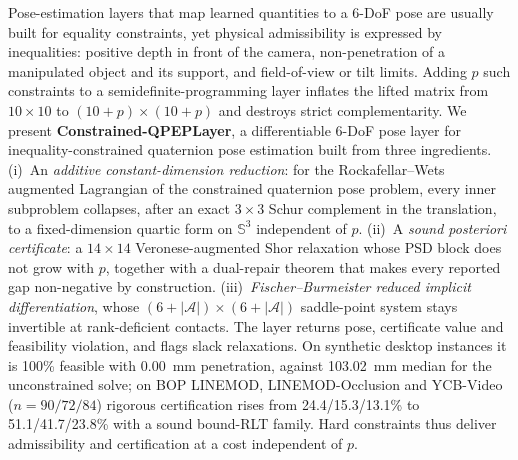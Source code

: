 Pose-estimation layers that map learned quantities to a 6-DoF pose are usually built for equality constraints, yet physical admissibility is expressed by inequalities: positive depth in front of the camera, non-penetration of a manipulated object and its support, and field-of-view or tilt limits. Adding $p$ such constraints to a semidefinite-programming layer inflates the lifted matrix from $10\times10$ to $(10+p)\times(10+p)$ and destroys strict complementarity. We present \textbf{Constrained-QPEPLayer}, a differentiable 6-DoF pose layer for inequality-constrained quaternion pose estimation built from three ingredients. (i)~An \emph{additive constant-dimension reduction}: for the Rockafellar--Wets augmented Lagrangian of the constrained quaternion pose problem, every inner subproblem collapses, after an exact $3\times3$ Schur complement in the translation, to a fixed-dimension quartic form on $\mathbb{S}^3$ independent of $p$. (ii)~A \emph{sound posteriori certificate}: a $14\times14$ Veronese-augmented Shor relaxation whose PSD block does not grow with $p$, together with a dual-repair theorem that makes every reported gap non-negative by construction. (iii)~\emph{Fischer--Burmeister reduced implicit differentiation}, whose $(6+|\mathcal A|)\times(6+|\mathcal A|)$ saddle-point system stays invertible at rank-deficient contacts. The layer returns pose, certificate value and feasibility violation, and flags slack relaxations. On synthetic desktop instances it is 100\% feasible with 0.00~mm penetration, against 103.02~mm median for the unconstrained solve; on BOP LINEMOD, LINEMOD-Occlusion and YCB-Video ($n=90/72/84$) rigorous certification rises from 24.4/15.3/13.1\% to 51.1/41.7/23.8\% with a sound bound-RLT family. Hard constraints thus deliver admissibility and certification at a cost independent of $p$.
